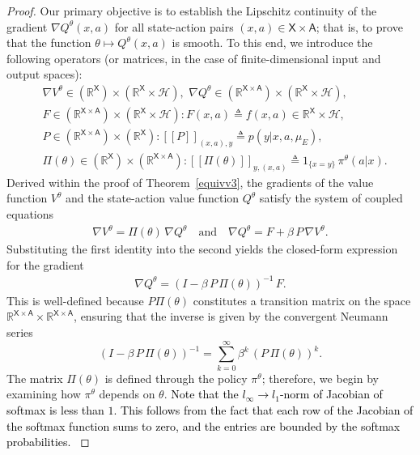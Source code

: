 \documentclass[11pt]{article}
\newcommand{\R}{\mathbb{R}}
\newcommand{\sX}{{\mathsf X}}
\newcommand{\sA}{{\mathsf A}}
\newcommand{\cH}{{\mathcal H}}
\newcommand{\tb}[1]{\textcolor{black}{#1}} %
\begin{document}
\begin{proof}
Our primary objective is to establish the Lipschitz continuity of the gradient $\nabla Q^{\theta}(x, a)$ for all state-action pairs $(x, a) \in \sX \times \sA$; that is, to prove that the function $\theta \mapsto Q^{\theta}(x, a)$ is smooth. 
To this end, we introduce the following operators (or matrices, in the case of finite-dimensional input and output spaces):
\begin{align*}
&\nabla V^{\theta} \in (\R^{\sX}) \times (\R^{\sX} \times \cH), \,\, \nabla Q^{\theta} \in (\R^{\sX \times \sA}) \times (\R^{\sX} \times \cH), \\ 
&F \in (\R^{\sX \times \sA}) \times (\R^{\sX} \times \cH): F(x,a) \triangleq f(x,a) \in \R^{\sX} \times \cH, \\
&P \in (\R^{\sX \times \sA}) \times (\R^{\sX}): [[P]]_{(x,a),y} \triangleq p(y|x,a,\mu_E), \\ 
&\Pi(\theta) \in (\R^{\sX}) \times (\R^{\sX \times \sA}): [[\Pi(\theta)]]_{y,(x,a)} \triangleq 1_{\{x=y\}} \, \pi^{\theta}(a|x).
\end{align*}
Derived within the proof of Theorem~\ref{equivv3}, the gradients of the value function $V^{\theta}$ and the state-action value function $Q^{\theta}$ satisfy the system of coupled equations
\begin{align*}
\nabla V^{\theta} = \Pi(\theta) \, \nabla Q^{\theta} \quad \text{and} \quad 
\nabla Q^{\theta} = F + \beta \, P \, \nabla V^{\theta}.
\end{align*}
Substituting the first identity into the second yields the closed-form expression for the gradient
\begin{align*}
\nabla Q^{\theta} = (I -\beta \, P \, \Pi(\theta))^{-1} \, F.
\end{align*}
This is well-defined because $P \Pi(\theta)$ constitutes a transition matrix on the space $\R^{\sX \times \sA} \times \R^{\sX \times \sA}$, ensuring that the inverse is given by the convergent Neumann series
$$
(I -\beta \, P \, \Pi(\theta))^{-1} = \sum_{k=0}^{\infty} \beta^k \, (P \, \Pi(\theta))^{k}.
$$
The matrix $\Pi(\theta)$ is defined through the policy $\pi^{\theta}$; therefore, we begin by examining how $\pi^{\theta}$ depends on $\theta$. \tb{ Note that the $l_{\infty} \to l_1$-norm of Jacobian of softmax is less than $1$. This follows from the fact that each row of the Jacobian of the softmax function sums to zero, and the entries are bounded by the softmax probabilities.
}
\end{proof}
\end{document}
